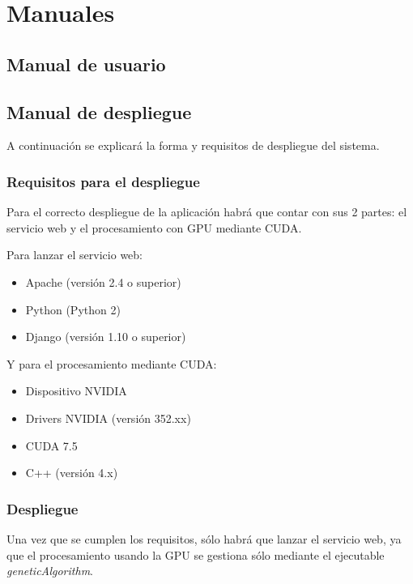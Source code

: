 \chapter{Manuales}


\section{Manual de usuario}
\bigskip



\section{Manual de despliegue}
\bigskip

A continuación se explicará la forma y requisitos de despliegue del sistema. 

\subsection{Requisitos para el despliegue}
\bigskip

Para el correcto despliegue de la aplicación habrá que contar con sus 2 partes: el servicio web y el procesamiento con GPU mediante CUDA.

\bigskip
Para lanzar el servicio web:
\begin{itemize}
	\item Apache (versión 2.4 o superior)
	\item Python (Python 2)
	\item Django  (versión 1.10 o superior)
\end{itemize} 

\bigskip
Y para el procesamiento mediante CUDA:
\begin{itemize}
	\item Dispositivo NVIDIA
	\item Drivers NVIDIA (versión 352.xx)
	\item CUDA 7.5
	\item C++ (versión 4.x)
\end{itemize} 

\subsection{Despliegue}
\bigskip


Una vez que se cumplen los requisitos, sólo habrá que lanzar el servicio web, ya que el procesamiento usando la GPU se gestiona sólo mediante el ejecutable \textit{geneticAlgorithm}.

